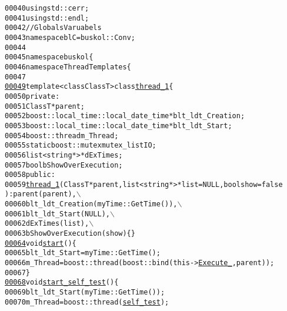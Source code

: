 \begin{footnotesize}
\begin{alltt}
00040 \textcolor{keyword}{using} std::cerr;
00041 \textcolor{keyword}{using} std::endl;
00042 \textcolor{comment}{//Globals Varuabels}
00043 \textcolor{keyword}{namespace }blC = buskol::Conv;
00044 
00045 \textcolor{keyword}{namespace }buskol\{
00046     \textcolor{keyword}{namespace }ThreadTemplates\{
00047 
\hypertarget{myThreadTemplates_8hpp_source_l00049}{}\hyperlink{classbuskol_1_1ThreadTemplates_1_1thread__1}{00049}     \textcolor{keyword}{template} <\textcolor{keyword}{class} ClassT> \textcolor{keyword}{class }\hyperlink{classbuskol_1_1ThreadTemplates_1_1thread__1}{thread_1}\{
00050         \textcolor{keyword}{private}:
00051             ClassT *parent; 
00052             boost::local\_time::local\_date\_time *blt\_ldt\_Creation; 
00053             boost::local\_time::local\_date\_time *blt\_ldt\_Start; 
00054             boost::thread m\_Thread; 
00055             \textcolor{keyword}{static} boost::mutex mutex\_listIO; 
00056             list<string*> *dExTimes; 
00057             \textcolor{keywordtype}{bool} bShowOverExecution; 
00058         \textcolor{keyword}{public}:
00059             \hyperlink{classbuskol_1_1ThreadTemplates_1_1thread__1}{thread_1}(ClassT *parent, list<string*> *list = NULL,\textcolor{keywordtype}{bool} show = \textcolor{keyword}{false
      }): parent(parent),\(\backslash\)
00060                 blt\_ldt\_Creation(myTime::GetTime()),\(\backslash\)
00061                 blt\_ldt\_Start(NULL),\(\backslash\)
00062                 dExTimes(list),\(\backslash\)
00063                 bShowOverExecution(show)\{\}
\hypertarget{myThreadTemplates_8hpp_source_l00064}{}\hyperlink{classbuskol_1_1ThreadTemplates_1_1thread__1_a71250f676aa96d06d5b693b685af7555}{00064}             \textcolor{keywordtype}{void} \hyperlink{classbuskol_1_1ThreadTemplates_1_1thread__1_a71250f676aa96d06d5b693b685af7555}{start}()\{
00065                 blt\_ldt\_Start = myTime::GetTime();
00066                 m\_Thread = boost::thread (boost::bind(this->\hyperlink{classbuskol_1_1ThreadTemplates_1_1thread__1_a37cde0d5c6105d9194ce1cf981cf9c5a}{Execute_},parent));
00067             \}
\hypertarget{myThreadTemplates_8hpp_source_l00068}{}\hyperlink{classbuskol_1_1ThreadTemplates_1_1thread__1_ad3a839cb3ec07abf8cf54fe81fd5e7f3}{00068}             \textcolor{keywordtype}{void} \hyperlink{classbuskol_1_1ThreadTemplates_1_1thread__1_ad3a839cb3ec07abf8cf54fe81fd5e7f3}{start_self_test}()\{
00069                 blt\_ldt\_Start(myTime::GetTime());
00070                 m\_Thread = boost::thread (\hyperlink{classbuskol_1_1ThreadTemplates_1_1thread__1_ac33a5aa33679452b203c539401c92929}{self_test});

\end{alltt}
\end{footnotesize}
